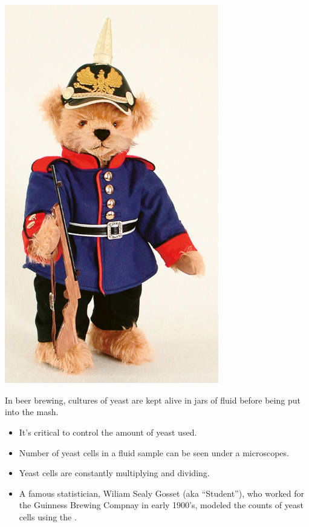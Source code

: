 \documentclass[slidestop,compress,mathserif]{beamer}
\begin{document}
\begin{frame}
{{\begin{center}
\includegraphics[width = 0.7\textwidth]{figures/prussian_soldier}
\end{center}
}
}
{
In beer brewing, cultures of yeast are kept alive in jars of fluid before being put into the mash.
\begin{itemize}
\item It's critical to control the amount of yeast used. %
\item Number of yeast cells in a fluid sample can be seen under a microscopes.
\item Yeast cells are constantly multiplying and dividing.
\item A famous statistician, Wiliam Sealy Gosset (aka ``Student''), who worked
for the Guinness Brewing Compnay in early 1900's, modeled
the counts of yeast cells using the .
\end{itemize}

}

\end{frame}
\end{document}
